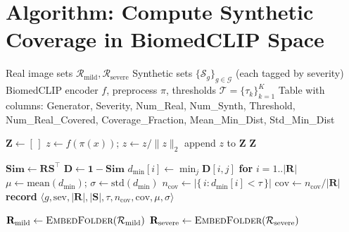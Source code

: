\documentclass[10pt]{article}
\begin{document}
\section*{Algorithm: Compute Synthetic Coverage in BiomedCLIP Space}

\begin{algorithm}[H]
\caption{Coverage of Synthetic Images w.r.t.\ Real Images}
\begin{small}
\begin{algorithmic}[1]

\Require Real image sets $\mathcal{R}_{\text{mild}}, \mathcal{R}_{\text{severe}}$
\Require Synthetic sets $\{\mathcal{S}_g\}_{g\in\mathcal{G}}$ (each tagged by severity)
\Require BiomedCLIP encoder $f$, preprocess $\pi$, thresholds $\mathcal{T}=\{\tau_k\}_{k=1}^{K}$
\Ensure Table with columns:
\Statex \hspace{1.5em} Generator, Severity, Num\_Real, Num\_Synth, Threshold,
\Statex \hspace{1.5em} Num\_Real\_Covered, Coverage\_Fraction, Mean\_Min\_Dist, Std\_Min\_Dist

\Statex

 
  \State $\mathbf{Z} \gets [\,]$
    \State $z \gets f(\pi(x))$; \quad $z \gets z/\|z\|_2$
    \State append $z$ to $\mathbf{Z}$
  \EndFor
  \State \Return $\mathbf{Z}$ 
\EndProcedure

\Statex

  \State $\mathbf{S\!im} \gets \mathbf{R}\mathbf{S}^\top$ 
  \State $\mathbf{D} \gets \mathbf{1}-\mathbf{S\!im}$ 
  \State $d_{\min}[i] \gets \min_j \mathbf{D}[i,j]$ \textbf{ for } $i=1..|\mathbf{R}|$
  \State $\mu \gets \mathrm{mean}(d_{\min})$; \quad $\sigma \gets \mathrm{std}(d_{\min})$
    \State $n_{\text{cov}} \gets |\{\,i : d_{\min}[i] < \tau\,\}|$
    \State $\text{cov} \gets n_{\text{cov}} / |\mathbf{R}|$
    \State \textbf{record} $\langle g, \text{sev}, |\mathbf{R}|, |\mathbf{S}|, \tau,
           n_{\text{cov}}, \text{cov}, \mu, \sigma \rangle$
  \EndFor
\EndProcedure

\Statex

\State $\mathbf{R}_{\text{mild}} \gets \Call{EmbedFolder}{\mathcal{R}_{\text{mild}}}$
\State $\mathbf{R}_{\text{severe}} \gets \Call{EmbedFolder}{\mathcal{R}_{\text{severe}}}$


\end{algorithmic}
\end{small}
\end{algorithm}
\end{document}
